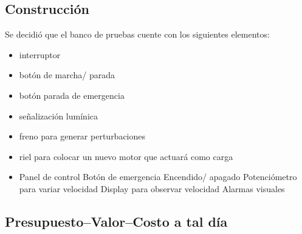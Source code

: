 
\subsection{Construcción}
Se decidió que el banco de pruebas cuente con los siguientes elementos:
\begin{itemize}
	\item interruptor
	\item botón de marcha/ parada
	\item botón parada de emergencia
	\item señalización lumínica
	\item freno para generar perturbaciones 
	\item riel para colocar un nuevo motor que actuará como carga
	\item Panel de control
		\subitem Botón de emergencia
		\subitem Encendido/ apagado
		\subitem Potenciómetro para variar velocidad
		\subitem Display para observar velocidad
		\subitem Alarmas visuales
\end{itemize}
\subsection{Presupuesto--Valor--Costo a tal día}


\newpage